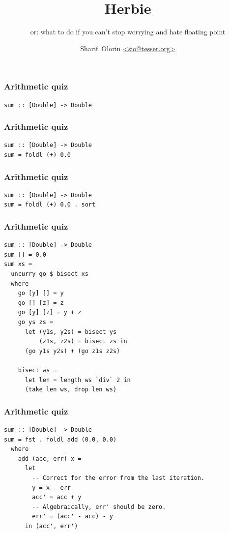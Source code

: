 \documentclass{beamer}
\title{Herbie}
\subtitle{or: what to do if you can't stop worrying and hate floating point}
\author{Sharif~Olorin \url{<sio@tesser.org>}}
\institute{Ambiata}
\begin{document}
\frame{\titlepage}

\begin{frame}[fragile]

\frametitle{Arithmetic quiz}

\begin{verbatim}
sum :: [Double] -> Double
\end{verbatim}

\end{frame}

\begin{frame}[fragile]

\frametitle{Arithmetic quiz}

\begin{verbatim}
sum :: [Double] -> Double
sum = foldl (+) 0.0
\end{verbatim}

\end{frame}

\begin{frame}[fragile]

\frametitle{Arithmetic quiz}

\begin{verbatim}
sum :: [Double] -> Double
sum = foldl (+) 0.0 . sort
\end{verbatim}

\end{frame}

\begin{frame}[fragile]


\frametitle{Arithmetic quiz}


\begin{verbatim}
sum :: [Double] -> Double
sum [] = 0.0
sum xs =
  uncurry go $ bisect xs
  where
    go [y] [] = y
    go [] [z] = z
    go [y] [z] = y + z
    go ys zs =
      let (y1s, y2s) = bisect ys
          (z1s, z2s) = bisect zs in
      (go y1s y2s) + (go z1s z2s)

    bisect ws =
      let len = length ws `div` 2 in
      (take len ws, drop len ws)
\end{verbatim}

\end{frame}

\begin{frame}[fragile]

\frametitle{Arithmetic quiz}

\begin{verbatim}
sum :: [Double] -> Double
sum = fst . foldl add (0.0, 0.0)
  where
    add (acc, err) x =
      let
        -- Correct for the error from the last iteration.
        y = x - err
        acc' = acc + y
        -- Algebraically, err' should be zero.
        err' = (acc' - acc) - y
      in (acc', err')
\end{verbatim}

\end{frame}
\end{document}
